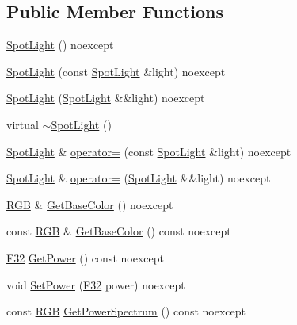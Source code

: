 \subsection*{Public Member Functions}
\begin{DoxyCompactItemize}
\item 
\hyperlink{classmage_1_1rendering_1_1_spot_light_abc287714a0bb8f4fab5960b7bcbb4316}{Spot\+Light} () noexcept
\item 
\hyperlink{classmage_1_1rendering_1_1_spot_light_a3e94a01b574efb8af5540e24d7af75c6}{Spot\+Light} (const \hyperlink{classmage_1_1rendering_1_1_spot_light}{Spot\+Light} \&light) noexcept
\item 
\hyperlink{classmage_1_1rendering_1_1_spot_light_a3520d2b04ca636436211e8e4fd929b42}{Spot\+Light} (\hyperlink{classmage_1_1rendering_1_1_spot_light}{Spot\+Light} \&\&light) noexcept
\item 
virtual \hyperlink{classmage_1_1rendering_1_1_spot_light_a3ef5b16d174fd45b40d929b8f06cdea3}{$\sim$\+Spot\+Light} ()
\item 
\hyperlink{classmage_1_1rendering_1_1_spot_light}{Spot\+Light} \& \hyperlink{classmage_1_1rendering_1_1_spot_light_a6bf91b086aa54f2e31d92ed401cf0fdc}{operator=} (const \hyperlink{classmage_1_1rendering_1_1_spot_light}{Spot\+Light} \&light) noexcept
\item 
\hyperlink{classmage_1_1rendering_1_1_spot_light}{Spot\+Light} \& \hyperlink{classmage_1_1rendering_1_1_spot_light_a58ff20b0459ccd6df54c85a361faa5ad}{operator=} (\hyperlink{classmage_1_1rendering_1_1_spot_light}{Spot\+Light} \&\&light) noexcept
\item 
\hyperlink{structmage_1_1_r_g_b}{R\+GB} \& \hyperlink{classmage_1_1rendering_1_1_spot_light_ac86581dd4af14206c11470beec10fe02}{Get\+Base\+Color} () noexcept
\item 
const \hyperlink{structmage_1_1_r_g_b}{R\+GB} \& \hyperlink{classmage_1_1rendering_1_1_spot_light_a66cf454577d92d091f6505f3ff52148f}{Get\+Base\+Color} () const noexcept
\item 
\hyperlink{namespacemage_aa97e833b45f06d60a0a9c4fc22ae02c0}{F32} \hyperlink{classmage_1_1rendering_1_1_spot_light_a835e4624ec959374b099dd07c7398929}{Get\+Power} () const noexcept
\item 
void \hyperlink{classmage_1_1rendering_1_1_spot_light_ac40537f953422276d68053e68df9fbe1}{Set\+Power} (\hyperlink{namespacemage_aa97e833b45f06d60a0a9c4fc22ae02c0}{F32} power) noexcept
\item 
const \hyperlink{structmage_1_1_r_g_b}{R\+GB} \hyperlink{classmage_1_1rendering_1_1_spot_light_a6dfa36c830bfa2878c04740c8c5f2e3b}{Get\+Power\+Spectrum} () const noexcept

\end{DoxyCompactItemize}
